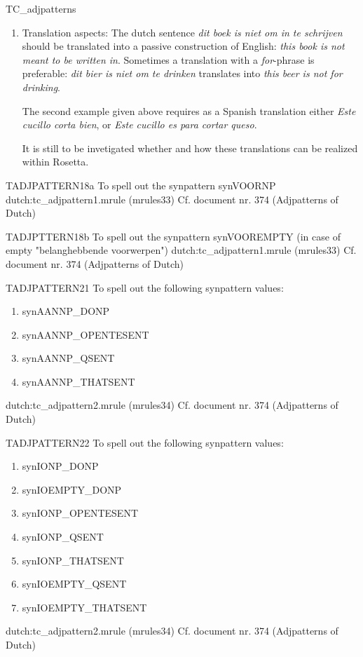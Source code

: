 \begin{mruleclass}{TC\_adjpatterns}
\begin{members}
\begin{member}
\begin{enumerate}
\item Translation aspects: The dutch sentence 
{\em dit boek is niet om in te schrijven} should be 
translated into a passive construction of English: {\em this book is not meant 
to be
written in}. Sometimes a translation with a {\em for}-phrase is preferable:
{\em dit bier is niet om te drinken} translates into {\em this beer is not for 
drinking}. 

The second example given above requires as a Spanish translation either
{\em Este cucillo corta bien}, or {\em Este cucillo es para cortar queso}.

It is still to be invetigated whether and how 
these translations can be realized within Rosetta. 
\end{enumerate}

\end{member}
\begin{member}
 TADJPATTERN18a
 To spell out the synpattern synVOORNP
\file dutch:tc\_adjpattern1.mrule (mrules33)
\semantics \nosemantics
\example Cf. document nr. 374 (Adjpatterns of Dutch)
\remarks
\end{member}
\begin{member}
 TADJPTTERN18b
 To spell out the synpattern synVOOREMPTY 
(in case of empty "belanghebbende voorwerpen")
\file dutch:tc\_adjpattern1.mrule (mrules33)
\semantics \nosemantics
\example Cf. document nr. 374 (Adjpatterns of Dutch)
\remarks

\end{member}
\begin{member}
 TADJPATTERN21
 To spell out the following synpattern values:
\begin{enumerate}
  \item synAANNP\_DONP
  \item synAANNP\_OPENTESENT 
  \item synAANNP\_QSENT
  \item synAANNP\_THATSENT
\end{enumerate}
\file dutch:tc\_adjpattern2.mrule (mrules34)
\semantics \nosemantics
\example Cf. document nr. 374 (Adjpatterns of Dutch)
\remarks

\end{member}
\begin{member}
 TADJPATTERN22
 To spell out the following synpattern values:
\begin{enumerate}
  \item synIONP\_DONP
  \item synIOEMPTY\_DONP 
  \item synIONP\_OPENTESENT
  \item synIONP\_QSENT
  \item synIONP\_THATSENT
  \item synIOEMPTY\_QSENT
  \item synIOEMPTY\_THATSENT
\end{enumerate}
\file dutch:tc\_adjpattern2.mrule (mrules34)
\semantics \nosemantics
\example Cf. document nr. 374 (Adjpatterns of Dutch)


\end{member}
\end{members}
\end{mruleclass}
